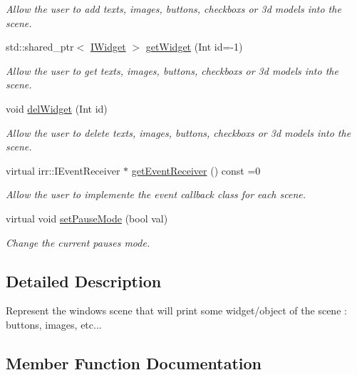 \begin{DoxyCompactItemize}
\begin{DoxyCompactList}\small\item\em Allow the user to add texts, images, buttons, checkboxs or 3d models into the scene. \end{DoxyCompactList}\item 
std\+::shared\+\_\+ptr$<$ \hyperlink{classIWidget}{I\+Widget} $>$ \hyperlink{classAScene_a04796ae4f8cfdf49f7e3295c29fc97cc}{get\+Widget} (Int id=-\/1)
\begin{DoxyCompactList}\small\item\em Allow the user to get texts, images, buttons, checkboxs or 3d models into the scene. \end{DoxyCompactList}\item 
void \hyperlink{classAScene_ad2b0ac8cd74a8523c76b681a34b5f5b4}{del\+Widget} (Int id)
\begin{DoxyCompactList}\small\item\em Allow the user to delete texts, images, buttons, checkboxs or 3d models into the scene. \end{DoxyCompactList}\item 
virtual irr\+::\+I\+Event\+Receiver $\ast$ \hyperlink{classAScene_af521e5e6d30a5d2e5d30eb333e4d3abd}{get\+Event\+Receiver} () const =0
\begin{DoxyCompactList}\small\item\em Allow the user to implemente the event callback class for each scene. \end{DoxyCompactList}\item 
virtual void \hyperlink{classAScene_a7ff45d7a24796f52d815c00770900339}{set\+Pause\+Mode} (bool val)
\begin{DoxyCompactList}\small\item\em Change the current pause\textquotesingle{}s mode. \end{DoxyCompactList}\end{DoxyCompactItemize}


\subsection{Detailed Description}
Represent the window\textquotesingle{}s scene that will print some widget/object of the scene \+: buttons, images, etc... 

\subsection{Member Function Documentation}
\mbox{\label{classAScene_aa711b6068dd8dee262160eedfd96ad02}} 
